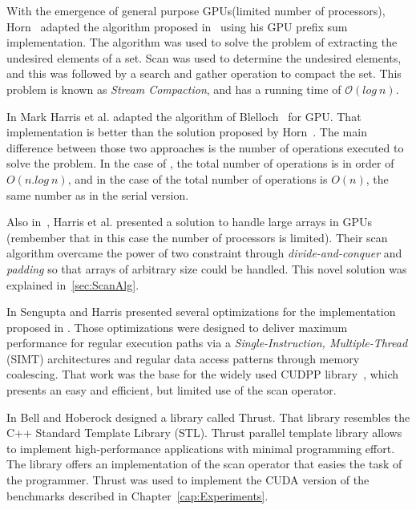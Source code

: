 \documentclass[Ingles]{ic-tese-v1}
\newcommand{\rcap}[1]{Chapter~\ref{cap:#1}}
\newcommand{\tit}[1]{{\textit{#1}}}
\begin{document}
With the emergence of general purpose GPUs(limited number of processors), Horn~\cite{GPUGems2} adapted the algorithm proposed in~\cite{dataparallel} using his GPU prefix sum implementation. The algorithm was used  to solve the problem of extracting the undesired elements of a set. Scan  was used to determine  the undesired elements, and this was followed by a search and  gather   operation  to   compact the set.  This   problem  is   known  as \textit{Stream   Compaction},  and has a running  time   of $\mathcal{O}(log\ n)$.

In \cite{harris2007parallel} Mark Harris  et al. adapted the algorithm of Blelloch~\cite{ScanAsPrimitive} for GPU. That  implementation is better than
the solution  proposed by Horn~\cite{GPUGems2}. The  main difference between those two approaches is the number of operations executed to
solve the problem. In the case of \cite{GPUGems2}, the total number of operations is in order of $O(n.log\ n)$, and in the case of \cite{harris2007parallel}
the  total number  of operations  is $O(n)$,  the same  number as  in the serial version.

Also in~\cite{harris2007parallel}, Harris et al. presented a solution  to handle large arrays in GPUs (rembember that in this case the
number of processors is limited). Their scan algorithm overcame the power of two constraint through \tit{divide-and-conquer} and \tit{padding}
so that arrays of arbitrary size could be handled. This novel solution was explained in~\ref{sec:ScanAlg}.

In   \cite{Sengupta:2008}  Sengupta and  Harris presented  several
optimizations     for      the     implementation      proposed     in
\cite{harris2007parallel}. Those  optimizations   were  designed  to
deliver  maximum  performance  for regular  execution  paths  via  a
\textit{Single-Instruction,  Multiple-Thread} (SIMT) architectures and
regular data access patterns through memory coalescing.  That work was
the  base  for  the  widely  used  CUDPP  library~\cite{CUDPP},  which
presents an easy and efficient, but limited use of the scan operator.

In  \cite{Nathan:2011} Bell  and  Hoberock designed  a library  called
Thrust.   That library  resembles  the C++  Standard Template  Library
(STL).   Thrust  parallel   template  library   allows  to   implement
high-performance  applications with  minimal  programming effort.  The
library offers an implementation of the scan operator that easies the task of
the programmer.  Thrust  was used  to implement  the CUDA version of the
benchmarks described in \rcap{Experiments}.
\end{document}
